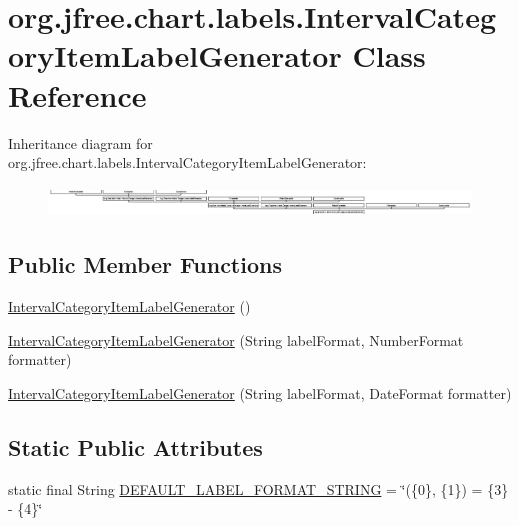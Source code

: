 \hypertarget{classorg_1_1jfree_1_1chart_1_1labels_1_1_interval_category_item_label_generator}{}\section{org.\+jfree.\+chart.\+labels.\+Interval\+Category\+Item\+Label\+Generator Class Reference}
\label{classorg_1_1jfree_1_1chart_1_1labels_1_1_interval_category_item_label_generator}
Inheritance diagram for org.\+jfree.\+chart.\+labels.\+Interval\+Category\+Item\+Label\+Generator\+:\begin{figure}[H]
\begin{center}
\leavevmode
\includegraphics[height=0.786517cm]{classorg_1_1jfree_1_1chart_1_1labels_1_1_interval_category_item_label_generator}
\end{center}
\end{figure}
\subsection*{Public Member Functions}
\begin{DoxyCompactItemize}
\item 
\mbox{\hyperlink{classorg_1_1jfree_1_1chart_1_1labels_1_1_interval_category_item_label_generator_aeff18ce645e584294235e322d8217a12}{Interval\+Category\+Item\+Label\+Generator}} ()
\item 
\mbox{\hyperlink{classorg_1_1jfree_1_1chart_1_1labels_1_1_interval_category_item_label_generator_a9873e76a900bd2ebfbd3c1906653cd61}{Interval\+Category\+Item\+Label\+Generator}} (String label\+Format, Number\+Format formatter)
\item 
\mbox{\hyperlink{classorg_1_1jfree_1_1chart_1_1labels_1_1_interval_category_item_label_generator_afd0c32fac937be7e37dabb06c74c27ed}{Interval\+Category\+Item\+Label\+Generator}} (String label\+Format, Date\+Format formatter)
\end{DoxyCompactItemize}
\subsection*{Static Public Attributes}
\begin{DoxyCompactItemize}
\item 
static final String \mbox{\hyperlink{classorg_1_1jfree_1_1chart_1_1labels_1_1_interval_category_item_label_generator_a9d50af79fede624420b1f5d875787876}{D\+E\+F\+A\+U\+L\+T\+\_\+\+L\+A\+B\+E\+L\+\_\+\+F\+O\+R\+M\+A\+T\+\_\+\+S\+T\+R\+I\+NG}} = \char`\"{}(\{0\}, \{1\}) = \{3\} -\/ \{4\}\char`\"{}
\end{DoxyCompactItemize}
